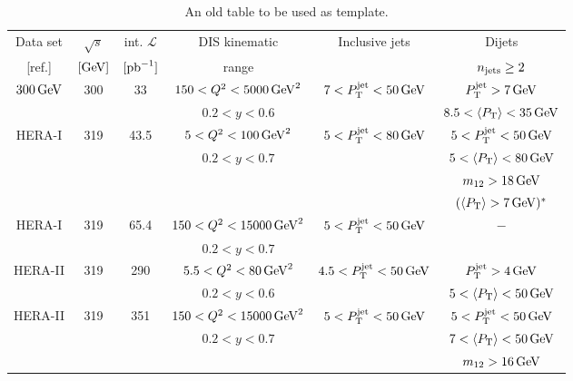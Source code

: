 \documentclass[12pt]{article}
\begin{document}
\begin{table}[tbhp]
  \footnotesize
  \begin{center}
    \begin{tabular}{cccccc}
      \hline
      \multicolumn{1}{c}{Data set} & $\sqrt{s}$ & int. $\mathcal{L}$ & DIS kinematic &  Inclusive jets &  Dijets   \\  
      \multicolumn{1}{c}{[ref.]}  & $[\mathrm{GeV}]$   & $[{\rm pb}^{-1}]$  &  range        &                 &   $n_{\rm jets}\ge2 $  \\   
      \hline
      $300\,\mathrm{GeV}$ & 300 & 33& $150<Q^{2}<5000\,\mathrm{GeV}^2$  & $7<P_{\rm T}^{\rm jet}<50\,\mathrm{GeV}$ & $P_{\rm T}^{\rm jet}>7\,\mathrm{GeV}$  \\
      \cite{Adloff:2000tq} &          & & $0.2<y<0.6$             &            & $8.5<\langle P_{\rm T} \rangle<35\,\mathrm{GeV}$    \\
      \hline
      HERA-I    & 319  &43.5 & $5<Q^{2}<100\,\mathrm{GeV}^2$   &   $5<P_{\rm T}^{\rm jet}<80\,\mathrm{GeV}$ & $5<P_{\rm T}^{\rm jet}<50\,\mathrm{GeV}$  \\
\cite{Aaron:2010ac}  &      &     & $0.2<y<0.7$                &                      & $5<\langle P_{\rm T} \rangle<80\,\mathrm{GeV}$  \\
                &           &     &                            &                      & $m_{12}>18\,\mathrm{GeV}$  \\
                &           &     &                            &                      & $(\langle P_{\rm T} \rangle>7\,\mathrm{GeV})^*$ \\
      \hline
      HERA-I    & 319  &65.4 & $150<Q^{2}<15000\,\mathrm{GeV}^2$   &   $5<P_{\rm T}^{\rm jet}<50\,\mathrm{GeV}$ & $-$  \\
\cite{Aktas:2007aa} &  &     & $0.2<y<0.7$             &                      &  \\
      \hline
      HERA-II   & 319  & 290& $5.5<Q^{2}<80\,\mathrm{GeV}^2$        & $4.5<P_{\rm T}^{\rm jet}<50\,\mathrm{GeV}$ & $P_{\rm T}^{\rm jet}>4\,\mathrm{GeV}$  \\
\cite{Andreev:2016tgi}&& & $0.2<y<0.6$                &                      & $5<\langle P_{\rm T} \rangle<50\,\mathrm{GeV}$  \\
      \hline
      HERA-II   & 319  & 351& $150<Q^{2}<15000\,\mathrm{GeV}^2$     &   $5<P_{\rm T}^{\rm jet}<50\,\mathrm{GeV}$ & $5<P_{\rm T}^{\rm jet}<50\,\mathrm{GeV}$  \\
 \cite{Andreev:2014wwa,Andreev:2016tgi}               &           & & $0.2<y<0.7$                &                      & $7<\langle P_{\rm T} \rangle<50\,\mathrm{GeV}$  \\
                &           & &                            &                      & $m_{12}>16\,\mathrm{GeV}$  \\
      \hline
    \end{tabular}
    \caption{
      An old table to be used as template.
    }
    \label{tab:datasets}
    \end{center}
\end{table}
\end{document}
